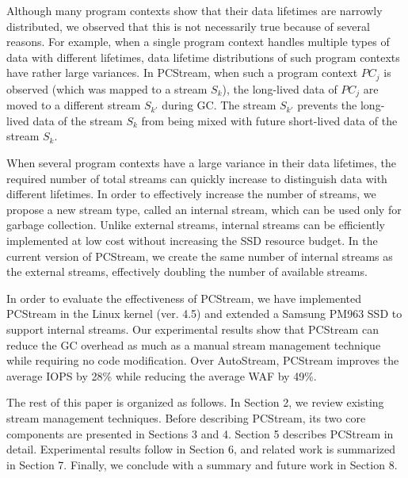 Although many program contexts show that their data lifetimes are narrowly
distributed, we observed that this is not necessarily true because of several
reasons.  For example, when a single program context handles multiple types of
data with different lifetimes, data lifetime distributions of such program
contexts  have rather large variances.  In \textsf{\small PCStream}, when such
a program context {\it $PC_j$} is observed (which was mapped to a stream {\it
$S_k$}), the long-lived data of {\it $PC_j$} are moved to a different stream
{\it $S_{k'}$} during GC.  The stream {\it $S_{k'}$} prevents the long-lived
data of the stream {\it $S_k$} from being mixed with future short-lived data of
the stream {\it $S_k$}.

When several program contexts have a large variance in their data lifetimes,
the required number of total streams can quickly increase to distinguish data
with different lifetimes.
In order to effectively increase the number of streams, we propose a new stream
type, called an internal stream, which can be used only for garbage collection.
Unlike external streams, internal streams can be efficiently implemented at low
cost without increasing the SSD resource budget.  In the current version of
\textsf{\small PCStream}, we create the same number of internal streams as the
external streams, effectively doubling the number of available streams. 

In order to evaluate the effectiveness of \textsf{\small PCStream}, we have
implemented \textsf{\small PCStream} in the Linux kernel (ver. 4.5) and
extended a Samsung PM963 SSD to support internal streams.  Our experimental
results show that \textsf{\small PCStream} can reduce the GC overhead as much
as a manual stream management technique while requiring no code modification.
Over \textsf{\small AutoStream}, \textsf{\small PCStream} improves the average
IOPS by 28\% while reducing the average WAF by 49\%.

The rest of this paper is organized as follows.  
In Section 2, we review existing stream management techniques.
Before describing \textsf{\small PCStream}, its two
core components are presented in Sections 3 and 4.  Section 5 describes
\textsf{\small PCStream} in detail.  Experimental results follow in Section 6,
and related work is summarized in Section 7.  Finally, we conclude with a
summary and future work in Section 8.

